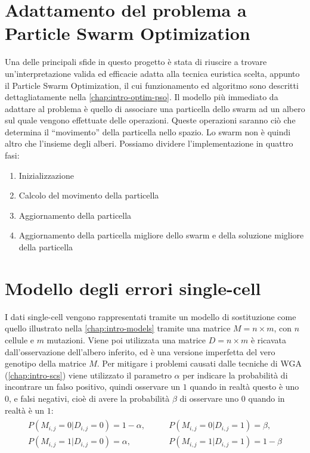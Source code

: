 \section{Adattamento del problema a Particle Swarm Optimization}
\label{chap:pso-adapt}
Una delle principali sfide in questo progetto è stata di riuscire a trovare un'interpretazione valida ed efficacie adatta alla tecnica euristica scelta, appunto il Particle Swarm Optimization, il cui funzionamento ed algoritmo sono descritti dettagliatamente nella \autoref{chap:intro-optim-pso}. Il modello più immediato da adattare al problema è quello di associare una particella dello swarm ad un albero sul quale vengono effettuate delle operazioni. Queste operazioni saranno ciò che determina il ``movimento'' della particella nello spazio. Lo swarm non è quindi altro che l'insieme degli alberi. Possiamo dividere l'implementazione in quattro fasi: \begin{enumerate}
  \item Inizializzazione
  \item Calcolo del movimento della particella
  \item Aggiornamento della particella
  \item Aggiornamento della particella migliore dello swarm e della soluzione migliore della particella
\end{enumerate}

\section{Modello degli errori single-cell}
\label{chap:pso-matrix}
I dati single-cell vengono rappresentati tramite un modello di sostituzione come quello illustrato nella \autoref{chap:intro-models} tramite una matrice $M = n \times m$, con $n$ cellule e $m$ mutazioni. Viene poi utilizzata una matrice $D = n \times m$ è ricavata dall'osservazione dell'albero inferito, ed è una versione imperfetta del vero genotipo della matrice $M$. Per mitigare i problemi causati dalle tecniche di WGA (\autoref{chap:intro-scs}) viene utilizzato il parametro $\alpha$ per indicare la probabilità di incontrare un falso positivo, quindi osservare un $1$ quando in realtà questo è uno $0$, e falsi negativi, cioè di avere la probabilità $\beta$ di osservare uno $0$ quando in realtà è un $1$:
\begin{align}
    \label{eq:pso-intro-model-matrix}
    \begin{split}
      P(M_{i,j} = 0 | D_{i,j} = 0) = 1 - \alpha, \qquad
      &P(M_{i,j} = 0 | D_{i,j} = 1) = \beta, \\
      P(M_{i,j} = 1 | D_{i,j} = 0) = \alpha, \qquad
      &P(M_{i,j} = 1 | D_{i,j} = 1) = 1 - \beta
    \end{split}
\end{align}

